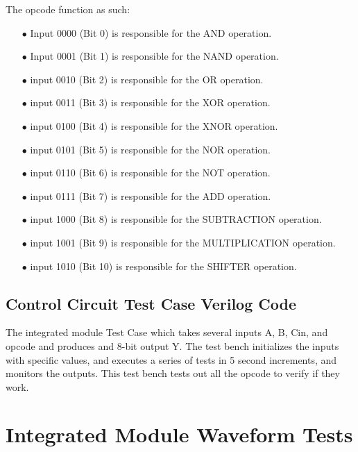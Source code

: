 \documentclass[12pt]{article}
\begin{document}
The opcode function as such:
\begin{itemize}
    \item[$\bullet$] Input 0000 (Bit 0) is responsible for the AND operation.  
    \item[$\bullet$] Input 0001 (Bit 1) is responsible for the NAND operation. 
    \item[$\bullet$] input 0010 (Bit 2) is responsible for the OR operation. 
    \item[$\bullet$] input 0011 (Bit 3) is responsible for the XOR operation. 
    \item[$\bullet$] input 0100 (Bit 4) is responsible for the XNOR operation. 
    \item[$\bullet$] input 0101 (Bit 5) is responsible for the NOR operation. 
    \item[$\bullet$] input 0110 (Bit 6) is responsible for the NOT operation. 
    \item[$\bullet$] input 0111 (Bit 7) is responsible for the ADD operation. 
    \item[$\bullet$] input 1000 (Bit 8) is responsible for the SUBTRACTION operation. 
    \item[$\bullet$] input 1001 (Bit 9) is responsible for the MULTIPLICATION operation. 
    \item[$\bullet$] input 1010 (Bit 10) is responsible for the SHIFTER operation. 
    
\end{itemize}



\subsection{Control Circuit Test Case Verilog Code}

The integrated module Test Case which takes several inputs A, B, Cin, and opcode and produces and 8-bit output Y. The test bench initializes the inputs with specific values, and executes a series of tests in 5 second increments, and monitors the outputs. This test bench tests out all the opcode to verify if they work.



\section{Integrated Module Waveform Tests}
\end{document}
